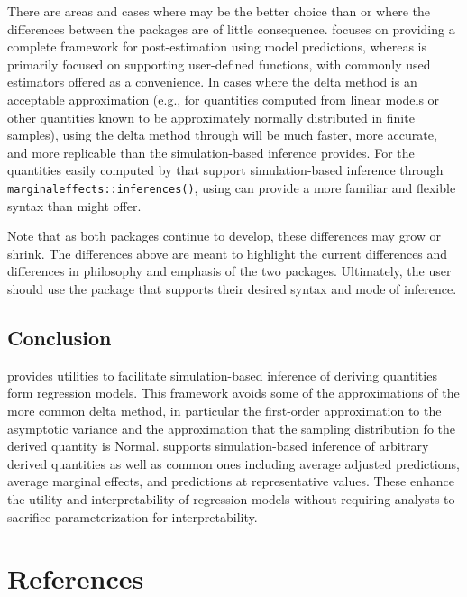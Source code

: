 There are areas and cases where  may be the better choice than  or where the differences between the packages are of little consequence.  focuses on providing a complete framework for post-estimation using model predictions, whereas  is primarily focused on supporting user-defined functions, with commonly used estimators offered as a convenience. In cases where the delta method is an acceptable approximation (e.g., for quantities computed from linear models or other quantities known to be approximately normally distributed in finite samples), using the delta method through  will be much faster, more accurate, and more replicable than the simulation-based inference  provides. For the quantities easily computed by  that support simulation-based inference through \texttt{marginaleffects::inferences()}, using  can provide a more familiar and flexible syntax than  might offer.

Note that as both packages continue to develop, these differences may grow or shrink. The differences above are meant to highlight the current differences and differences in philosophy and emphasis of the two packages. Ultimately, the user should use the package that supports their desired syntax and mode of inference.

\hypertarget{conclusion}{%
\subsection{Conclusion}\label{conclusion}}

 provides utilities to facilitate simulation-based inference of deriving quantities form regression models. This framework avoids some of the approximations of the more common delta method, in particular the first-order approximation to the asymptotic variance and the approximation that the sampling distribution fo the derived quantity is Normal.  supports simulation-based inference of arbitrary derived quantities as well as common ones including average adjusted predictions, average marginal effects, and predictions at representative values. These enhance the utility and interpretability of regression models without requiring analysts to sacrifice parameterization for interpretability.

\hypertarget{references}{%
\section*{References}\label{references}}


